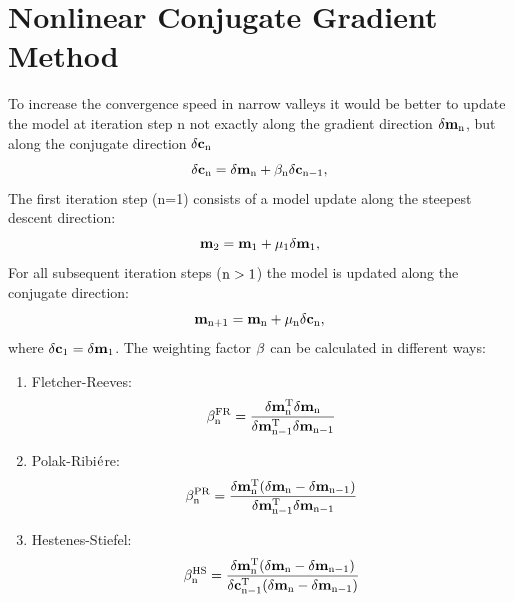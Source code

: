 \section{Nonlinear Conjugate Gradient Method}\label{NL_Conjugate_Gradient} 
To increase the convergence speed in narrow valleys it would be better to update the model at iteration step n not exactly along the gradient direction $\rm{\delta \mathbf{m}_n}$, but along the conjugate direction $\rm{\delta \mathbf{c}_n}$
\begin{equation}
\rm{\delta \mathbf{c}_n = \delta \mathbf{m}_n + \beta_n \delta \mathbf{c}_{n-1},}  
\label{conj1}
\end{equation}
The first iteration step (n=1) consists of a model update along the steepest descent direction:
\begin{equation} 
\rm{\mathbf{m}_{2} = \mathbf{m}_{1} + \mu_1 \mathbf{\delta m}_{1}, }
\label{conj1:1}
\end{equation}
For all subsequent iteration steps ($\rm{n>1}$) the model is updated along the conjugate direction:
\begin{equation} 
\rm{\mathbf{m}_{n+1} = \mathbf{m}_{n} + \mu_n \mathbf{\delta c}_{n}, }
\label{conj1:2}
\end{equation}
where $ \rm{\delta \mathbf{c}_{1} = \delta \mathbf{m}_1}$.
The weighting factor $\rm{\beta}$ can be calculated in different ways:
\begin{enumerate}
\item Fletcher-Reeves:\\
\begin{equation}
\rm{\beta^{FR}_n=\frac{\delta \mathbf{m}^T_n \delta \mathbf{m}_n}{\delta \mathbf{m}^T_{n-1} \delta \mathbf{m}_{n-1}}}
\label{conj2}
\end{equation}
\item Polak-Ribi$\rm{\acute{e}}$re:\\
\begin{equation}
\rm{\beta^{PR}_n=\frac{\delta \mathbf{m}^T_n (\delta \mathbf{m}_n - \delta \mathbf{m}_{n-1})}{\delta \mathbf{m}^T_{n-1} \delta \mathbf{m}_{n-1}}}
\label{conj3}
\end{equation}
\item Hestenes-Stiefel:\\
\begin{equation}
\rm{\beta^{HS}_n=\frac{\delta \mathbf{m}^T_n (\delta \mathbf{m}_n - \delta \mathbf{m}_{n-1})}{\delta \mathbf{c}^T_{n-1} (\delta \mathbf{m}_n - \delta \mathbf{m}_{n-1})}}
\end{equation}
\end{enumerate}
